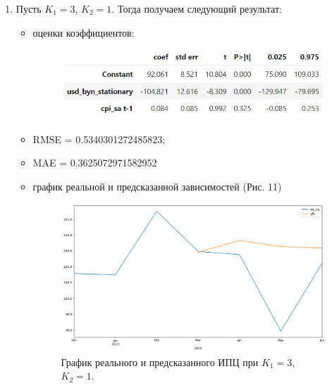 \documentclass[a4paper, 12pt]{extarticle}
\begin{document}
\begin{enumerate}
\begin{itemize}
			
		\end{itemize}
		
			\item Пусть $K_1 = 3$, $K_2 = 1$. Тогда получаем следующий результат:
			\begin{itemize}
				\item оценки коэффициентов:
				\begin{figure}[h!]
					\centering
					\includegraphics[scale=1.1]{images/tab_7}
					\label{fig:tab7}
				\end{figure}
				
				\item RMSE = 0.5340301272485823;
				\item MAE = 0.3625072971582952
				\item график реальной и предсказанной зависимостей (Рис. 11)
				\begin{figure}[tph!]
					\centering
					\includegraphics[scale=0.4]{images/pic_11}
					\caption[Рис. 11]{График реального и предсказанного ИПЦ при $K_1 = 3$, $K_2 = 1$.}
					\label{fig:pic11}
				\end{figure}
			\end{itemize}
		\end{enumerate}
\end{document}

